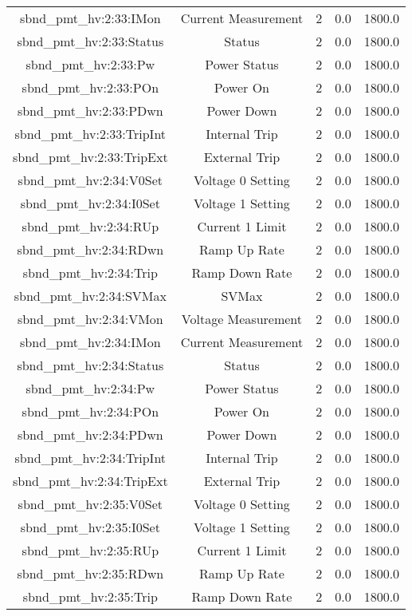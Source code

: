 \begin{table}[ptb]
\begin{tabular}{c | c c c c}
sbnd_pmt_hv:2:33:IMon & Current Measurement & 2 & 0.0 & 1800.0\\ 
sbnd_pmt_hv:2:33:Status & Status & 2 & 0.0 & 1800.0\\ 
sbnd_pmt_hv:2:33:Pw & Power Status & 2 & 0.0 & 1800.0\\ 
sbnd_pmt_hv:2:33:POn & Power On & 2 & 0.0 & 1800.0\\ 
sbnd_pmt_hv:2:33:PDwn & Power Down & 2 & 0.0 & 1800.0\\ 
sbnd_pmt_hv:2:33:TripInt & Internal Trip & 2 & 0.0 & 1800.0\\ 
sbnd_pmt_hv:2:33:TripExt & External Trip & 2 & 0.0 & 1800.0\\ 
sbnd_pmt_hv:2:34:V0Set & Voltage 0 Setting & 2 & 0.0 & 1800.0\\ 
sbnd_pmt_hv:2:34:I0Set & Voltage 1 Setting & 2 & 0.0 & 1800.0\\ 
sbnd_pmt_hv:2:34:RUp & Current 1 Limit & 2 & 0.0 & 1800.0\\ 
sbnd_pmt_hv:2:34:RDwn & Ramp Up Rate & 2 & 0.0 & 1800.0\\ 
sbnd_pmt_hv:2:34:Trip & Ramp Down Rate & 2 & 0.0 & 1800.0\\ 
sbnd_pmt_hv:2:34:SVMax & SVMax & 2 & 0.0 & 1800.0\\ 
sbnd_pmt_hv:2:34:VMon & Voltage Measurement & 2 & 0.0 & 1800.0\\ 
sbnd_pmt_hv:2:34:IMon & Current Measurement & 2 & 0.0 & 1800.0\\ 
sbnd_pmt_hv:2:34:Status & Status & 2 & 0.0 & 1800.0\\ 
sbnd_pmt_hv:2:34:Pw & Power Status & 2 & 0.0 & 1800.0\\ 
sbnd_pmt_hv:2:34:POn & Power On & 2 & 0.0 & 1800.0\\ 
sbnd_pmt_hv:2:34:PDwn & Power Down & 2 & 0.0 & 1800.0\\ 
sbnd_pmt_hv:2:34:TripInt & Internal Trip & 2 & 0.0 & 1800.0\\ 
sbnd_pmt_hv:2:34:TripExt & External Trip & 2 & 0.0 & 1800.0\\ 
sbnd_pmt_hv:2:35:V0Set & Voltage 0 Setting & 2 & 0.0 & 1800.0\\ 
sbnd_pmt_hv:2:35:I0Set & Voltage 1 Setting & 2 & 0.0 & 1800.0\\ 
sbnd_pmt_hv:2:35:RUp & Current 1 Limit & 2 & 0.0 & 1800.0\\ 
sbnd_pmt_hv:2:35:RDwn & Ramp Up Rate & 2 & 0.0 & 1800.0\\ 
sbnd_pmt_hv:2:35:Trip & Ramp Down Rate & 2 & 0.0 & 1800.0\\ 

\end{tabular}
\end{table}
